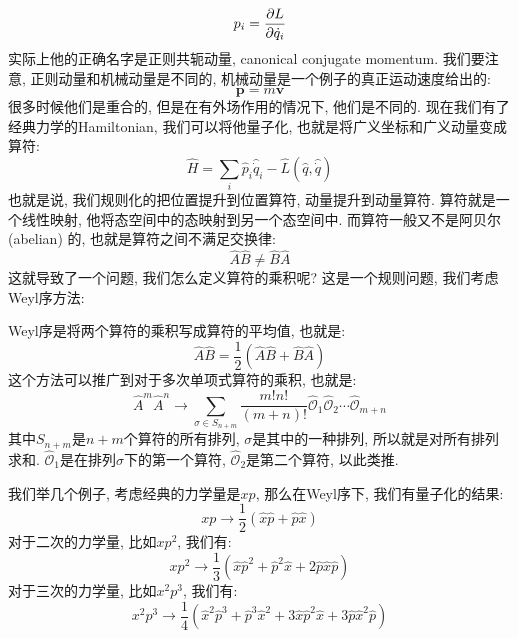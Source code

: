 \begin{equation}
  p_i = \pdv{L}{\dot{q}_i}
\end{equation}
实际上他的正确名字是正则共轭动量, canonical conjugate momentum.
我们要注意, 正则动量和机械动量是不同的, 机械动量是一个例子的真正运动速度给出的:
\begin{equation}
  \bm{p} = m \bm{v}
\end{equation}
很多时候他们是重合的, 但是在有外场作用的情况下, 他们是不同的.
现在我们有了经典力学的Hamiltonian, 我们可以将他量子化, 也就是将广义坐标和广义动量变成算符:
\begin{equation}
  \hat{H} = \sum_i \hat{p}_i \hat{\dot{q}}_i - \hat{L}(\hat{q}, \hat{\dot{q}})
\end{equation}
也就是说, 我们规则化的把位置提升到位置算符, 动量提升到动量算符.
算符就是一个线性映射, 他将态空间中的态映射到另一个态空间中.
而算符一般又不是阿贝尔 (abelian) 的, 也就是算符之间不满足交换律:
\begin{equation}
  \hat{A} \hat{B} \neq \hat{B} \hat{A}
\end{equation}
这就导致了一个问题, 我们怎么定义算符的乘积呢?
这是一个规则问题, 我们考虑Weyl序方法:
\begin{definition}[][Weyl序]
  Weyl序是将两个算符的乘积写成算符的平均值, 也就是:
  \begin{equation}
    \hat{A} \hat{B} = \frac{1}{2} (\hat{A} \hat{B} + \hat{B} \hat{A})
  \end{equation}
  这个方法可以推广到对于多次单项式算符的乘积, 也就是:
  \begin{equation}
    \hat{A}^m \hat{A}^n \to \sum_{\sigma \in S_{n+m}} \frac{m! n!}{(m+n)!} \hat{\mathcal{O}}_1 \hat{\mathcal{O}}_2 \cdots \hat{\mathcal{O}}_{m+n}
  \end{equation}
  其中$S_{n+m}$是$n+m$个算符的所有排列, $\sigma$是其中的一种排列, 所以就是对所有排列求和.
  $\hat{\mathcal{O}}_1$是在排列$\sigma$下的第一个算符, $\hat{\mathcal{O}}_2$是第二个算符, 以此类推.
\end{definition}
我们举几个例子, 考虑经典的力学量是$xp$, 那么在Weyl序下, 我们有量子化的结果:
\begin{equation}
  xp \to \frac{1}{2} (\hat{x} \hat{p} + \hat{p} \hat{x})
\end{equation}
对于二次的力学量, 比如$xp^2$, 我们有:
\begin{equation}
  xp^2 \to \frac{1}{3} (\hat{x} \hat{p}^2 + \hat{p}^2 \hat{x} + 2 \hat{p} \hat{x} \hat{p})
\end{equation}
对于三次的力学量, 比如$x^2 p^3$, 我们有:
\begin{equation}
  x^2 p^3 \to \frac{1}{4} (\hat{x}^2 \hat{p}^3 + \hat{p}^3 \hat{x}^2 + 3 \hat{x} \hat{p}^2 \hat{x} + 3 \hat{p} \hat{x}^2 \hat{p})
\end{equation}
